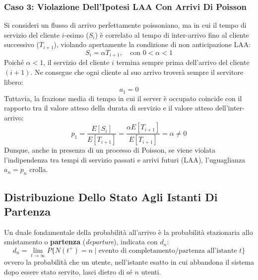 \documentclass[11pt, a4paper]{article}
\begin{document}
\subsubsection{Caso 3: Violazione Dell'Ipotesi LAA Con Arrivi Di Poisson}

Si consideri un flusso di arrivo perfettamente poissoniano, ma in cui il tempo di servizio del cliente $i$-esimo ($S_i$) è correlato al tempo di inter-arrivo fino al cliente successivo ($T_{i+1}$), violando apertamente la condizione di non anticipazione LAA:
\[
S_i = \alpha T_{i+1}, \quad \text{con } 0 < \alpha < 1
\]
Poiché $\alpha < 1$, il servizio del cliente $i$ termina sempre prima dell'arrivo del cliente $(i+1)$. Ne consegue che ogni cliente al suo arrivo troverà sempre il servitore libero:
\[
a_1 = 0
\]
Tuttavia, la frazione media di tempo in cui il server è occupato coincide con il rapporto tra il valore atteso della durata di servizio e il valore atteso dell'inter-arrivo:
\[
p_1 = \frac{E[S_i]}{E[T_{i+1}]} = \frac{\alpha E[T_{i+1}]}{E[T_{i+1}]} = \alpha \neq 0
\]
Dunque, anche in presenza di un processo di Poisson, se viene violata l'indipendenza tra tempi di servizio passati e arrivi futuri (LAA), l'uguaglianza $a_n = p_n$ crolla.

\subsection{Distribuzione Dello Stato Agli Istanti Di Partenza}

Un duale fondamentale della probabilità all'arrivo è la probabilità stazionaria allo smistamento o \textbf{partenza} (\emph{departure}), indicata con $d_n$:
\[
d_n = \lim_{t \to \infty} P\{N(t^+) = n \mid \text{evento di completamento/partenza all'istante } t\}
\]
ovvero la probabilità che un utente, nell'istante esatto in cui abbandona il sistema dopo essere stato servito, lasci dietro di sé $n$ utenti.

\end{document}
